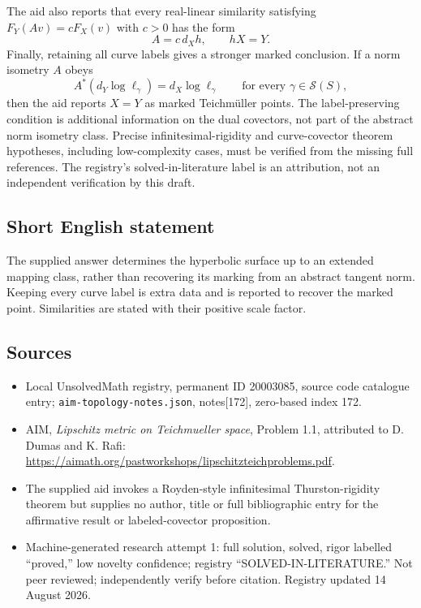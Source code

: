 \documentclass[11pt]{article}
\begin{document}
The aid also reports that every real-linear similarity satisfying $F_Y(Av)=cF_X(v)$ with $c>0$ has the form
\[
 A=c\,d_Xh,\qquad hX=Y.
\]
Finally, retaining all curve labels gives a stronger marked conclusion. If a norm isometry $A$ obeys
\[
 A^*(d_Y\log\ell_\gamma)=d_X\log\ell_\gamma
 \qquad\text{for every }\gamma\in\mathcal S(S),
\]
then the aid reports $X=Y$ as marked Teichm\"uller points. The label-preserving condition is additional information on the dual covectors, not part of the abstract norm isometry class. Precise infinitesimal-rigidity and curve-covector theorem hypotheses, including low-complexity cases, must be verified from the missing full references. The registry's solved-in-literature label is an attribution, not an independent verification by this draft.
\subsection{Short English statement}
The supplied answer determines the hyperbolic surface up to an extended mapping class, rather than recovering its marking from an abstract tangent norm. Keeping every curve label is extra data and is reported to recover the marked point. Similarities are stated with their positive scale factor.
\subsection{Sources}
\begin{itemize}
\item Local UnsolvedMath registry, permanent ID 20003085, source code catalogue entry; \texttt{aim-topology-notes.json}, notes[172], zero-based index 172.
\item AIM, \emph{Lipschitz metric on Teichmueller space}, Problem 1.1, attributed to D. Dumas and K. Rafi: \url{https://aimath.org/pastworkshops/lipschitzteichproblems.pdf}.
\item The supplied aid invokes a Royden-style infinitesimal Thurston-rigidity theorem but supplies no author, title or full bibliographic entry for the affirmative result or labeled-covector proposition.
\item Machine-generated research attempt 1: full solution, solved, rigor labelled ``proved,'' low novelty confidence; registry ``SOLVED-IN-LITERATURE.'' Not peer reviewed; independently verify before citation. Registry updated 14 August 2026.
\end{itemize}
\end{document}
